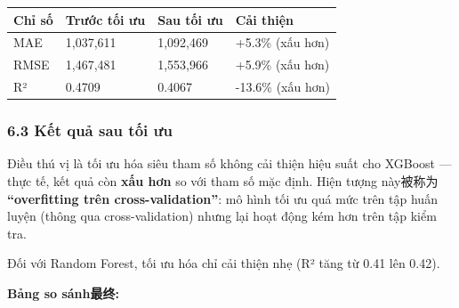 \documentclass[11pt]{article}
\begin{document}
\begin{longtable}[]{@{}llll@{}}
\toprule\noalign{}
Chỉ số & Trước tối ưu & Sau tối ưu & Cải thiện \\
\midrule\noalign{}
\endhead
\bottomrule\noalign{}
\endlastfoot
MAE & 1,037,611 & 1,092,469 & +5.3\% (xấu hơn) \\
RMSE & 1,467,481 & 1,553,966 & +5.9\% (xấu hơn) \\
R² & 0.4709 & 0.4067 & -13.6\% (xấu hơn) \\
\end{longtable}

\subsubsection{6.3 Kết quả sau tối
ưu}\label{kux1ebft-quux1ea3-sau-tux1ed1i-ux1b0u}

Điều thú vị là tối ưu hóa siêu tham số không cải thiện hiệu suất cho
XGBoost --- thực tế, kết quả còn \textbf{xấu hơn} so với tham số mặc
định. Hiện tượng này被称为 \textbf{``overfitting trên
cross-validation''}: mô hình tối ưu quá mức trên tập huấn luyện (thông
qua cross-validation) nhưng lại hoạt động kém hơn trên tập kiểm tra.

Đối với Random Forest, tối ưu hóa chỉ cải thiện nhẹ (R² tăng từ 0.41 lên
0.42).

\textbf{Bảng so sánh最终:}
\end{document}

